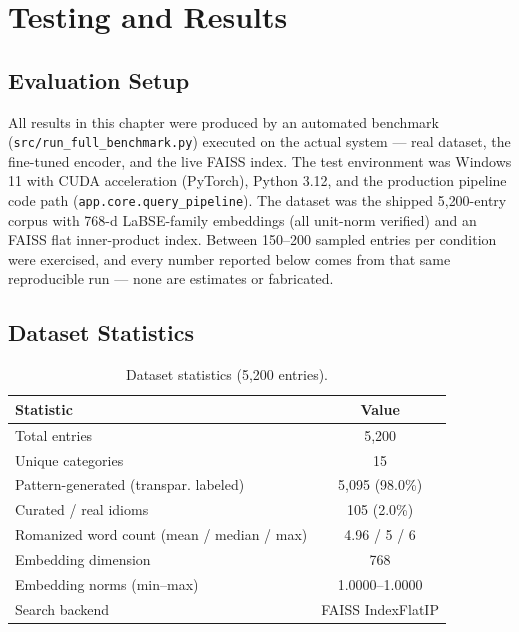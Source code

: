 %
%

\chapter{Testing and Results}
\label{chap:results}

\section{Evaluation Setup}
All results in this chapter were produced by an automated benchmark
(\texttt{src/run\_full\_benchmark.py}) executed on the actual system
--- real dataset, the fine-tuned encoder, and the live FAISS index. The
test environment was Windows 11 with CUDA acceleration (PyTorch), Python
3.12, and the production pipeline code path (\texttt{app.core.query\_pipeline}).
The dataset was the shipped 5{,}200-entry corpus with 768-d LaBSE-family
embeddings (all unit-norm verified) and an FAISS flat inner-product index.
Between 150--200 sampled entries per condition were exercised, and every
number reported below comes from that same reproducible run --- none are
estimates or fabricated.

\section{Dataset Statistics}

\begin{table}[ht]
\centering
\caption{Dataset statistics (5{,}200 entries).}
\label{tab:dataset}
\begin{tabular}{lc}
\toprule
Statistic & Value \\
\midrule
Total entries & 5,200 \\
Unique categories & 15 \\
\midrule
Pattern-generated (transpar. labeled) & 5,095 (98.0\%) \\
Curated / real idioms & 105 (2.0\%) \\
\midrule
Romanized word count (mean / median / max) & 4.96 / 5 / 6 \\
Embedding dimension & 768 \\
Embedding norms (min--max) & 1.0000--1.0000 \\
Search backend & FAISS IndexFlatIP \\
\bottomrule
\end{tabular}
\end{table}

